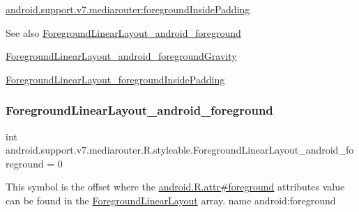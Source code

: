 {\ttfamily \hyperlink{classandroid_1_1support_1_1v7_1_1mediarouter_1_1R_1_1styleable_a99710c55c5f5f29b77ac73ecd8f54630}{android.\+support.\+v7.\+mediarouter\+:foreground\+Inside\+Padding}}

\begin{DoxySeeAlso}{See also}
\hyperlink{classandroid_1_1support_1_1v7_1_1mediarouter_1_1R_1_1styleable_ab8851867a96c3cbe9b169e1c26ce1a76}{Foreground\+Linear\+Layout\+\_\+android\+\_\+foreground} 

\hyperlink{classandroid_1_1support_1_1v7_1_1mediarouter_1_1R_1_1styleable_a853dd75e050dc0c4b4fca83329d52f96}{Foreground\+Linear\+Layout\+\_\+android\+\_\+foreground\+Gravity} 

\hyperlink{classandroid_1_1support_1_1v7_1_1mediarouter_1_1R_1_1styleable_a99710c55c5f5f29b77ac73ecd8f54630}{Foreground\+Linear\+Layout\+\_\+foreground\+Inside\+Padding} 
\end{DoxySeeAlso}
\mbox{\label{classandroid_1_1support_1_1v7_1_1mediarouter_1_1R_1_1styleable_ab8851867a96c3cbe9b169e1c26ce1a76}} 
\subsubsection{\texorpdfstring{Foreground\+Linear\+Layout\+\_\+android\+\_\+foreground}{ForegroundLinearLayout\_android\_foreground}}
{\footnotesize\ttfamily int android.\+support.\+v7.\+mediarouter.\+R.\+styleable.\+Foreground\+Linear\+Layout\+\_\+android\+\_\+foreground = 0\hspace{0.3cm}{\ttfamily [static]}}

This symbol is the offset where the \hyperlink{}{android.\+R.\+attr\#foreground} attribute\textquotesingle{}s value can be found in the \hyperlink{classandroid_1_1support_1_1v7_1_1mediarouter_1_1R_1_1styleable_a49fc131534b262fe1dc04e9f42f46d9b}{Foreground\+Linear\+Layout} array.  name android\+:foreground \mbox{\label{classandroid_1_1support_1_1v7_1_1mediarouter_1_1R_1_1styleable_a853dd75e050dc0c4b4fca83329d52f96}} 
